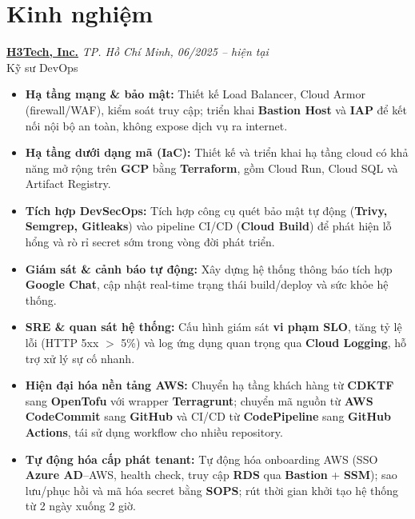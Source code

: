 \documentclass[a4paper,10pt]{article}
\begin{document}
\section*{Kinh nghiệm}
\noindent \textbf{\href{https://www.linkedin.com/company/h3tech/posts/?feedView=all}{H3Tech, Inc.}} \hfill \textit{TP. Hồ Chí Minh, 06/2025 -- hiện tại}  \\
Kỹ sư DevOps \\
\begin{itemize}[leftmargin=*, itemsep=2pt]
    \item \textbf{Hạ tầng mạng \& bảo mật:} Thiết kế Load Balancer, Cloud Armor (firewall/WAF), kiểm soát truy cập; triển khai \textbf{Bastion Host} và \textbf{IAP} để kết nối nội bộ an toàn, không expose dịch vụ ra internet.
    \item \textbf{Hạ tầng dưới dạng mã (IaC):} Thiết kế và triển khai hạ tầng cloud có khả năng mở rộng trên \textbf{GCP} bằng \textbf{Terraform}, gồm Cloud Run, Cloud SQL và Artifact Registry.
    \item \textbf{Tích hợp DevSecOps:} Tích hợp công cụ quét bảo mật tự động (\textbf{Trivy, Semgrep, Gitleaks}) vào pipeline CI/CD (\textbf{Cloud Build}) để phát hiện lỗ hổng và rò rỉ secret sớm trong vòng đời phát triển.
    \item \textbf{Giám sát \& cảnh báo tự động:} Xây dựng hệ thống thông báo tích hợp \textbf{Google Chat}, cập nhật real-time trạng thái build/deploy và sức khỏe hệ thống.
    \item \textbf{SRE \& quan sát hệ thống:} Cấu hình giám sát \textbf{vi phạm SLO}, tăng tỷ lệ lỗi (HTTP 5xx $>$ 5\%) và log ứng dụng quan trọng qua \textbf{Cloud Logging}, hỗ trợ xử lý sự cố nhanh.
    \item \textbf{Hiện đại hóa nền tảng AWS:} Chuyển hạ tầng khách hàng từ \textbf{CDKTF} sang \textbf{OpenTofu} với wrapper \textbf{Terragrunt}; chuyển mã nguồn từ \textbf{AWS CodeCommit} sang \textbf{GitHub} và CI/CD từ \textbf{CodePipeline} sang \textbf{GitHub Actions}, tái sử dụng workflow cho nhiều repository.
    \item \textbf{Tự động hóa cấp phát tenant:} Tự động hóa onboarding AWS (SSO \textbf{Azure AD}--AWS, health check, truy cập \textbf{RDS} qua \textbf{Bastion} + \textbf{SSM}); sao lưu/phục hồi và mã hóa secret bằng \textbf{SOPS}; rút thời gian khởi tạo hệ thống từ 2 ngày xuống 2 giờ.
\end{itemize}
\end{document}
